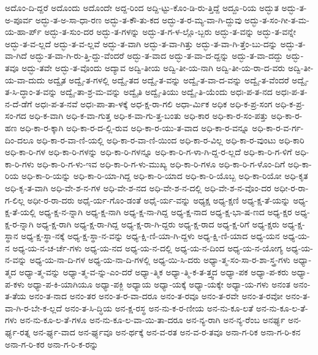 {ಅದೊಂ-ದಿ-ದ್ದರೆ
ಅದೊಂದು
ಅದೊಂದೇ
ಅದ್ದ-ರಿಂದ
ಅದ್ದಿ-ಟ್ಟು-ಕೊಂ-ಡಿ-ರು-ತ್ತಿದ್ದೆ
ಅದ್ದೂ-ರಿಯ
ಅದ್ಭುತ
ಅದ್ಭು-ತ-ಅ-ಪೂರ್ವ
ಅದ್ಭು-ತ-ಅ-ಸಾ-ಧಾ-ರಣ
ಅದ್ಭು-ತ-ಕೌ-ತು-ಕದ
ಅದ್ಭು-ತ-ರ-ಮ್ಯ-ವಾ-ಗಿ-ದ್ದುವು
ಅದ್ಭು-ತ-ಸಂ-ಗೀ-ತ-ಮ-ಯ-ಹಾ-ರ್ಪ್
ಅದ್ಭು-ತ-ಸುಂ-ದರ
ಅದ್ಭು-ತ-ಗಳನ್ನು
ಅದ್ಭು-ತ-ಗ-ಳ-ಲ್ಲೊ-ಬ್ಬರು
ಅದ್ಭು-ತ-ವನ್ನು
ಅದ್ಭು-ತ-ವನ್ನೇ
ಅದ್ಭು-ತ-ವ-ಲ್ಲದೆ
ಅದ್ಭು-ತ-ವ-ಲ್ಲವೆ
ಅದ್ಭು-ತ-ವಾಗಿ
ಅದ್ಭು-ತ-ವಾ-ಗಿತ್ತು
ಅದ್ಭು-ತ-ವಾ-ಗಿ-ತ್ತೆಂ-ಬು-ದನ್ನು
ಅದ್ಭು-ತ-ವಾ-ಗಿದೆ
ಅದ್ಭು-ತ-ವಾ-ಗಿ-ರು-ತ್ತಿ-ದ್ದು-ವೆಂದರೆ
ಅದ್ಭು-ತ-ವಾದ
ಅದ್ಭು-ತ-ವಾ-ದ-ದ್ದನ್ನು
ಅದ್ಭು-ತ-ವಾ-ದದ್ದು
ಅದ್ಭು-ತವೂ
ಅದ್ಭು-ತವೇ
ಅದ್ಭು-ತ-ವೊಂದು
ಅದ್ಯಾವ
ಅದ್ವಿ-ತೀಯ
ಅದ್ವಿ-ತೀ-ಯ-ನಾಗಿ
ಅದ್ವಿ-ತೀ-ಯ-ರಾ-ದ-ವರು
ಅದ್ವಿ-ತೀ-ಯ-ವಾ-ದುದು
ಅದ್ವೈತ
ಅದ್ವೈ-ತ-ಗಳಲ್ಲಿ
ಅದ್ವೈ-ತದ
ಅದ್ವೈ-ತ-ವನ್ನು
ಅದ್ವೈ-ತ-ವಾ-ದ-ವನ್ನು
ಅದ್ವೈ-ತ-ವೆಂದರೆ
ಅದ್ವೈ-ತ-ಸಿ-ದ್ಧಾಂ-ತ-ವನ್ನು
ಅದ್ವೈ-ತಾ-ಶ್ರ-ಮ-ವನ್ನು
ಅದ್ವೈತಿ
ಅದ್ವೈ-ತಿಯು
ಅದ್ವೈ-ತಿ-ಯೆಂದು
ಅಧಃ-ಪ-ತ-ನದ
ಅಧಃ-ಪ-ತ-ನ-ದೆ-ಡೆಗೆ
ಅಧಃ-ಪ-ತ-ನವೆ
ಅಧಃ-ಪಾ-ತಾ-ಳಕ್ಕೆ
ಅಧ-ಕ್ಷ-ರಾ-ಗಲಿ
ಅಧಾ-ರ್ಮಿಕ
ಅಧಿಕ
ಅಧಿ-ಕ-ಪ್ರ-ಸಂಗ
ಅಧಿ-ಕ-ಪ್ರ-ಸಂ-ಗದ
ಅಧಿ-ಕ-ವಾಗಿ
ಅಧಿ-ಕ-ವಾ-ಗುತ್ತ
ಅಧಿ-ಕ-ವಾ-ಗು-ತ್ತ-ಬಂತು
ಅಧಿ-ಕಾರ
ಅಧಿ-ಕಾ-ರ-ಸಂ-ಪತ್ತು
ಅಧಿ-ಕಾ-ರ-ಹಣ
ಅಧಿ-ಕಾ-ರ-ಕ್ಕಾಗಿ
ಅಧಿ-ಕಾ-ರ-ದ-ಲ್ಲಿ-ರುವ
ಅಧಿ-ಕಾ-ರ-ಯು-ತ-ವಾದ
ಅಧಿ-ಕಾ-ರ-ವನ್ನೂ
ಅಧಿ-ಕಾ-ರ-ವ-ರ್ಗ-ದಿಂ-ದಲೂ
ಅಧಿ-ಕಾ-ರ-ವಾ-ಣಿ-ಯಲ್ಲಿ
ಅಧಿ-ಕಾ-ರ-ವಾ-ಣಿ-ಯಿಂದ
ಅಧಿ-ಕಾ-ರ-ವಿಲ್ಲ
ಅಧಿ-ಕಾ-ರ-ವುಂಟು
ಅಧಿ-ಕಾರಿ
ಅಧಿ-ಕಾ-ರಿ-ಗಳ
ಅಧಿ-ಕಾ-ರಿ-ಗಳನ್ನು
ಅಧಿ-ಕಾ-ರಿ-ಗಳನ್ನೂ
ಅಧಿ-ಕಾ-ರಿ-ಗ-ಳಾ-ಗಿ-ದ್ದ-ರ-ಲ್ಲದೆ
ಅಧಿ-ಕಾ-ರಿ-ಗ-ಳಿಗೆ
ಅಧಿ-ಕಾ-ರಿ-ಗಳು
ಅಧಿ-ಕಾ-ರಿ-ಗ-ಳು-ಇವ
ಅಧಿ-ಕಾ-ರಿ-ಗ-ಳು-ಮುಖ್ಯ
ಅಧಿ-ಕಾ-ರಿ-ಗಳೂ
ಅಧಿ-ಕಾ-ರಿ-ಗ-ಳೊಂ-ದಿಗೆ
ಅಧಿ-ಕಾ-ರಿಯ
ಅಧಿ-ಕಾ-ರಿ-ಯನ್ನು
ಅಧಿ-ಕಾ-ರಿ-ಯಾ-ಗಿದ್ದ
ಅಧಿ-ಕಾ-ರಿ-ಯಾದ
ಅಧಿ-ಕಾ-ರಿ-ಯೊಬ್ಬ
ಅಧಿ-ಕಾ-ರಿಯೋ
ಅಧಿ-ಕೃತ
ಅಧಿ-ಕೃ-ತ-ವಾಗಿ
ಅಧಿ-ವೇ-ಶ-ನ-ಗಳ
ಅಧಿ-ವೇ-ಶ-ನದ
ಅಧಿ-ವೇ-ಶ-ನ-ದಲ್ಲಿ
ಅಧಿ-ವೇ-ಶ-ನ-ವೊಂ-ದರ
ಅಧೀ-ರ-ರಾ-ಗ-ಲಿಲ್ಲ
ಅಧೀ-ರ-ರಾ-ದರು
ಅಧೈ-ರ್ಯ-ಗೊಂ-ಡಂತೆ
ಅಧೈ-ರ್ಯ-ವನ್ನು
ಅಧ್ಯಕ್ಷ
ಅಧ್ಯ-ಕ್ಷಣಿ
ಅಧ್ಯ-ಕ್ಷ-ತೆ-ಯನ್ನು
ಅಧ್ಯ-ಕ್ಷ-ತೆ-ಯಲ್ಲಿ
ಅಧ್ಯ-ಕ್ಷ-ನ-ನ್ನಾಗಿ
ಅಧ್ಯ-ಕ್ಷ-ನಾಗಿ
ಅಧ್ಯ-ಕ್ಷ-ನಾ-ಗಿದ್ದ
ಅಧ್ಯ-ಕ್ಷ-ನಾದ
ಅಧ್ಯ-ಕ್ಷ-ಭಾ-ಷ-ಣದ
ಅಧ್ಯ-ಕ್ಷರ
ಅಧ್ಯ-ಕ್ಷ-ರ-ನ್ನಾಗಿ
ಅಧ್ಯ-ಕ್ಷ-ರಾಗಿ
ಅಧ್ಯ-ಕ್ಷ-ರಾ-ಗಿದ್ದ
ಅಧ್ಯ-ಕ್ಷ-ರಾ-ಗಿ-ದ್ದರು
ಅಧ್ಯ-ಕ್ಷ-ರಾದ
ಅಧ್ಯ-ಕ್ಷ-ರಿಗೆ
ಅಧ್ಯ-ಕ್ಷರು
ಅಧ್ಯ-ಕ್ಷ-ಸ್ಥಾನ
ಅಧ್ಯ-ಕ್ಷ-ಸ್ಥಾ-ನಕ್ಕೆ
ಅಧ್ಯ-ಕ್ಷ-ಸ್ಥಾ-ನ-ವನ್ನು
ಅಧ್ಯ-ಕ್ಷಿ-ಣಿ-ಯಾ-ಗಿ-ದ್ದಳು
ಅಧ್ಯ-ಕ್ಷಿ-ಣಿ-ಯಾದ
ಅಧ್ಯ-ಯನ
ಅಧ್ಯ-ಯ-ನ
ಅಧ್ಯ-ಯ-ನ-ಚ-ರ್ಚೆ-ಗಳು
ಅಧ್ಯ-ಯ-ನದ
ಅಧ್ಯ-ಯ-ನ-ದಲ್ಲಿ
ಅಧ್ಯ-ಯ-ನ-ದಿಂದ
ಅಧ್ಯ-ಯ-ನ-ಯೋಗ್ಯ
ಅಧ್ಯ-ಯ-ನ-ವನ್ನು
ಅಧ್ಯ-ಯ-ನಾ-ದಿ-ಗಳ
ಅಧ್ಯ-ಯ-ನಾ-ದಿ-ಗಳಲ್ಲಿ
ಅಧ್ಯ-ಯಿ-ಸಿ-ದರು
ಅಧ್ಯಾ-ತ್ಮ-ಸಂ-ಸಾ-ರ-ಶಾ-ಸ್ತ್ರ-ಗಳು
ಅಧ್ಯಾ-ತ್ಮದ
ಅಧ್ಯಾ-ತ್ಮ-ವನ್ನು
ಅಧ್ಯಾ-ತ್ಮ-ವ-ನ್ನು-ಎಂ-ದರೆ
ಅಧ್ಯಾ-ತ್ಮಿಕ
ಅಧ್ಯಾ-ತ್ಮಿ-ಕ-ತ-ತ್ತ್ವದ
ಅಧ್ಯಾ-ಪಕ
ಅಧ್ಯಾ-ಪ-ಕರು
ಅಧ್ಯಾ-ಪ-ಕಳು
ಅಧ್ಯಾ-ಪ-ಕಿ-ಯಾಗಿಯೂ
ಅಧ್ಯಾ-ಪಕ್ಜಿ
ಅಧ್ಯಾಯ
ಅಧ್ಯಾ-ಯಕ್ಕೆ
ಅಧ್ಯಾ-ಯಕ್ಕೇ
ಅಧ್ಯಾ-ಯ-ಗಳು
ಅನಂತ
ಅನಂ-ತ-ತೆಯ
ಅನಂ-ತ-ನಾದ
ಅನಂ-ತರ
ಅನಂ-ತ-ರ-ವಾ-ದರೂ
ಅನಂ-ತ-ರವೂ
ಅನಂ-ತ-ರವೇ
ಅನಂ-ತ-ರವೋ
ಅನಂ-ತ-ವಾ-ಗಿ-ರ-ಬೇ-ಕ-ಲ್ಲದೆ
ಅನಂ-ತ-ಸಿ-ದ್ಧಿಯ
ಅನ-ಕ್ಷ-ರಸ್ಥ
ಅನ-ನು-ಕ-ರ-ಣೀಯ
ಅನ-ನು-ಕೂ-ಲತೆ
ಅನ-ನು-ಕೂ-ಲ-ತೆ-ಗಳು
ಅನ-ನು-ಕೂ-ಲ-ತೆ-ಗಳೂ
ಅನ-ನು-ಕೂ-ಲ-ವಾ-ಯಿ-ತಾ-ದರೂ
ಅನ-ನ್ಯ-ರಾಗಿ
ಅನ-ನ್ಯ-ರೆಂಬ
ಅನರ್ಘ್ಯ
ಅನ-ರ್ಘ್ಯ-ರತ್ನ
ಅನ-ರ್ಘ್ಯ-ವಾದ
ಅನ-ರ್ಘ್ಯವೂ
ಅನ-ರ್ಥಕ್ಕೆ
ಅನ-ವ-ರತ
ಅನ-ವ-ರ-ತವೂ
ಅನಾ-ಗ-ರಿಕ
ಅನಾ-ಗ-ರಿ-ಕನ
ಅನಾ-ಗ-ರಿ-ಕರ
ಅನಾ-ಗ-ರಿ-ಕ-ರನ್ನು
}
